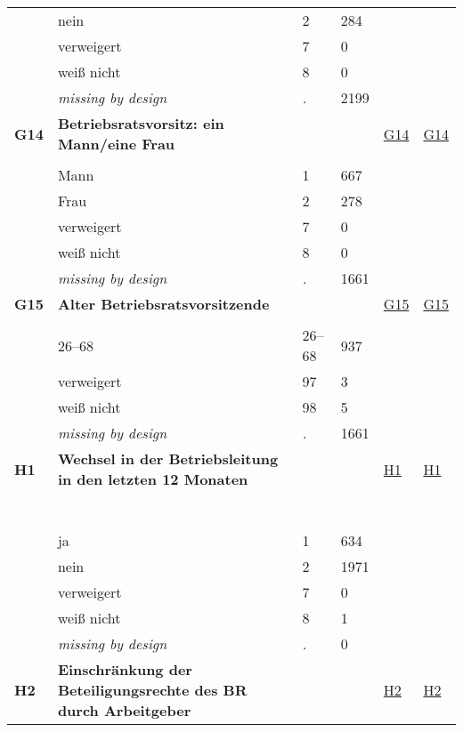 \begin{longtable}{| L{2.45cm} | L{6cm} | C{1.5cm} | R{1cm} | C{2.25cm} | C{2.25cm} |}
   & nein & 2 & 284 &  &  \\ 
   & verweigert & 7 & 0 &  &  \\ 
   & weiß nicht & 8 & 0 &  &  \\ 
   & \textit{missing by design} & \textit{.} & 2199 &  &  \\ 
   \midrule
\textbf{G14}\label{var:G14} & \textbf{Betriebsratsvorsitz: ein Mann/eine Frau} &  &  & \hyperref[G14]{G14} & \hyperref[var:suf:G14]{G14} \\ 
   &  &  &  &  &  \\ 
   & Mann & 1 & 667 &  &  \\ 
   & Frau & 2 & 278 &  &  \\ 
   & verweigert & 7 & 0 &  &  \\ 
   & weiß nicht & 8 & 0 &  &  \\ 
   & \textit{missing by design} & \textit{.} & 1661 &  &  \\ 
   \midrule
\textbf{G15}\label{var:G15} & \textbf{Alter Betriebsratsvorsitzende} &  &  & \hyperref[G15]{G15} & \hyperref[var:suf:G15]{G15} \\ 
   &  &  &  &  &  \\ 
   & 26--68 & 26--68 & 937 &  &  \\ 
   & verweigert & 97 & 3 &  &  \\ 
   & weiß nicht & 98 & 5 &  &  \\ 
   & \textit{missing by design} & \textit{.} & 1661 &  &  \\ 
   \midrule
\textbf{H1}\label{var:H1} & \textbf{Wechsel in der Betriebsleitung in den letzten 12 Monaten} &  &  & \hyperref[H1]{H1} & \hyperref[var:suf:H1]{H1} \\ 
   & \protect\subsection[Variablen H1 bis I17a]{} &  &  &  &  \\ 
   & ja & 1 & 634 &  &  \\ 
   & nein & 2 & 1971 &  &  \\ 
   & verweigert & 7 & 0 &  &  \\ 
   & weiß nicht & 8 & 1 &  &  \\ 
   & \textit{missing by design} & \textit{.} & 0 &  &  \\ 
   \midrule
\textbf{H2}\label{var:H2} & \textbf{Einschränkung der Beteiligungsrechte des BR durch Arbeitgeber} &  &  & \hyperref[H2]{H2} & \hyperref[var:suf:H2]{H2} \\ 

\end{longtable}
